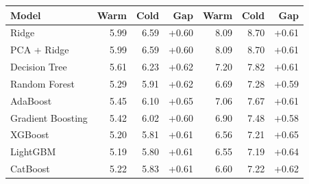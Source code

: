 \begin{tabular}{lrrrrrr}
\toprule
Model & Warm & Cold & Gap & Warm & Cold & Gap \\
\midrule
Ridge & 5.99 & 6.59 & +0.60 & 8.09 & 8.70 & +0.61 \\
PCA + Ridge & 5.99 & 6.59 & +0.60 & 8.09 & 8.70 & +0.61 \\
Decision Tree & 5.61 & 6.23 & +0.62 & 7.20 & 7.82 & +0.61 \\
Random Forest & 5.29 & 5.91 & +0.62 & 6.69 & 7.28 & +0.59 \\
AdaBoost & 5.45 & 6.10 & +0.65 & 7.06 & 7.67 & +0.61 \\
Gradient Boosting & 5.42 & 6.02 & +0.60 & 6.90 & 7.48 & +0.58 \\
XGBoost & 5.20 & 5.81 & +0.61 & 6.56 & 7.21 & +0.65 \\
LightGBM & 5.19 & 5.80 & +0.61 & 6.55 & 7.19 & +0.64 \\
CatBoost & 5.22 & 5.83 & +0.61 & 6.60 & 7.22 & +0.62 \\
\bottomrule
\end{tabular}
